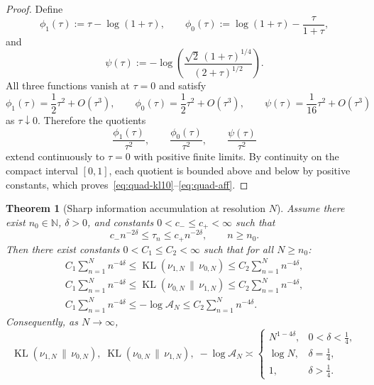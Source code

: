 \documentclass[11pt,a4paper]{amsart}
\theoremstyle{plain}
\newtheorem{theorem}{Theorem}[section]
\theoremstyle{definition}
\theoremstyle{remark}
\DeclareMathOperator{\KL}{KL}
\newcommand{\N}{\mathbb{N}}
\newcommand{\Acal}{\mathcal A}
\begin{document}
\begin{proof}
Define
\[
\phi_1(\tau):=\tau-\log(1+\tau),
\qquad
\phi_0(\tau):=\log(1+\tau)-\frac{\tau}{1+\tau},
\]
and
\[
\psi(\tau):=
-\log\!\left(
\frac{\sqrt{2}\,(1+\tau)^{1/4}}{(2+\tau)^{1/2}}
\right).
\]
All three functions vanish at $\tau=0$ and satisfy
\[
\phi_1(\tau)=\frac12\tau^2+O(\tau^3),
\qquad
\phi_0(\tau)=\frac12\tau^2+O(\tau^3),
\qquad
\psi(\tau)=\frac{1}{16}\tau^2+O(\tau^3)
\]
as $\tau\downarrow0$. Therefore the quotients
\[
\frac{\phi_1(\tau)}{\tau^2},
\qquad
\frac{\phi_0(\tau)}{\tau^2},
\qquad
\frac{\psi(\tau)}{\tau^2}
\]
extend continuously to $\tau=0$ with positive finite limits. By continuity on the compact
interval $[0,1]$, each quotient is bounded above and below by positive constants, which
proves~\eqref{eq:quad-kl10}--\eqref{eq:quad-aff}.
\end{proof}

\begin{theorem}[Sharp information accumulation at resolution $N$]
\label{thm:ratesN}
Assume there exist $n_0\in\N$, $\delta>0$, and constants
$0<c_-\le c_+<\infty$ such that
\begin{equation}\label{eq:tau-asymp}
c_- n^{-2\delta}\le \tau_n \le c_+ n^{-2\delta},
\qquad n\ge n_0.
\end{equation}
Then there exist constants $0<C_1\le C_2<\infty$ such that for all $N\ge n_0$:
\begin{align}
C_1\sum_{n=1}^N n^{-4\delta}
\le
\KL(\nu_{1,N}\,\|\,\nu_{0,N})
\le
C_2\sum_{n=1}^N n^{-4\delta}, \label{eq:rate-kl10}\\
C_1\sum_{n=1}^N n^{-4\delta}
\le
\KL(\nu_{0,N}\,\|\,\nu_{1,N})
\le
C_2\sum_{n=1}^N n^{-4\delta}, \label{eq:rate-kl01}\\
C_1\sum_{n=1}^N n^{-4\delta}
\le
-\log \Acal_N
\le
C_2\sum_{n=1}^N n^{-4\delta}. \label{eq:rate-aff}
\end{align}
Consequently, as $N\to\infty$,
\begin{equation}\label{eq:phase-rates}
\KL(\nu_{1,N}\,\|\,\nu_{0,N}),
\;
\KL(\nu_{0,N}\,\|\,\nu_{1,N}),
\;
-\log \Acal_N
\asymp
\begin{cases}
N^{1-4\delta}, & 0<\delta<\tfrac14,\\[4pt]
\log N, & \delta=\tfrac14,\\[4pt]
1, & \delta>\tfrac14.
\end{cases}
\end{equation}
\end{theorem}
\end{document}
